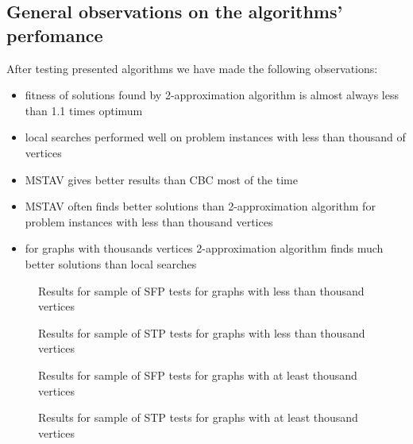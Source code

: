 \subsection{General observations on the algorithms' perfomance}
\FloatBarrier
After testing presented algorithms we have made the following observations:
\begin{itemize}
\item fitness of solutions found by 2-approximation algorithm is almost always less than 1.1 times optimum
\item local searches performed well on problem instances with less than thousand of vertices
\item MSTAV gives better results than CBC most of the time
\item MSTAV often finds better solutions than 2-approximation algorithm for problem instances with less than thousand vertices
\item for graphs with thousands vertices 2-approximation algorithm finds much better solutions than local searches
\end{itemize}

\begin{figure}[hb]
  \centering
  
  \caption{Results for sample of SFP tests for graphs with less than thousand vertices}
\end{figure}

\begin{figure}[hb]
  \centering
  
  \caption{Results for sample of STP tests for graphs with less than thousand vertices}
\end{figure}

\begin{figure}[hb]
  \centering
  
  \caption{Results for sample of SFP tests for graphs with at least thousand vertices}
\end{figure}

\begin{figure}[hb]
  \centering
  
  \caption{Results for sample of STP tests for graphs with at least thousand vertices}
\end{figure}

\FloatBarrier
